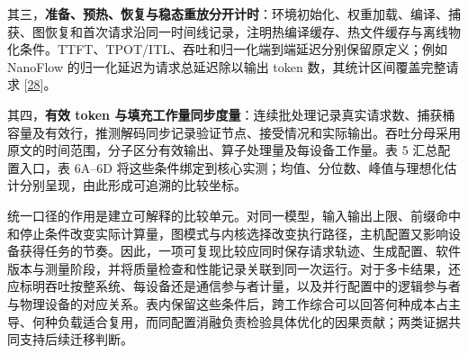 \documentclass[UTF8,10.5pt,fontset=windows]{ctexart}
\begin{document}
其三，\textbf{准备、预热、恢复与稳态重放分开计时}：环境初始化、权重加载、编译、捕获、图恢复和首次请求沿同一时间线记录，注明热编译缓存、热文件缓存与离线物化条件。TTFT、TPOT/ITL、吞吐和归一化端到端延迟分别保留原定义；例如
NanoFlow 的归一化延迟为请求总延迟除以输出 token
数，其统计区间覆盖完整请求
{[}\protect\hyperlink{ref-zhu2025nanoflow}{28}{]}。

其四，\textbf{有效 token
与填充工作量同步度量}：连续批处理记录真实请求数、捕获桶容量及有效行，推测解码同步记录验证节点、接受情况和实际输出。吞吐分母采用原文的时间范围，分子区分有效输出、算子处理量及每设备工作量。表
5 汇总配置入口，表 6A--6D
将这些条件绑定到核心实测；均值、分位数、峰值与理想化估计分别呈现，由此形成可追溯的比较坐标。

统一口径的作用是建立可解释的比较单元。对同一模型，输入输出上限、前缀命中和停止条件改变实际计算量，图模式与内核选择改变执行路径，主机配置又影响设备获得任务的节奏。因此，一项可复现比较应同时保存请求轨迹、生成配置、软件版本与测量阶段，并将质量检查和性能记录关联到同一次运行。对于多卡结果，还应标明吞吐按整系统、每设备还是通信参与者计量，以及并行配置中的逻辑参与者与物理设备的对应关系。表内保留这些条件后，跨工作综合可以回答何种成本占主导、何种负载适合复用，而同配置消融负责检验具体优化的因果贡献；两类证据共同支持后续迁移判断。
\end{document}
